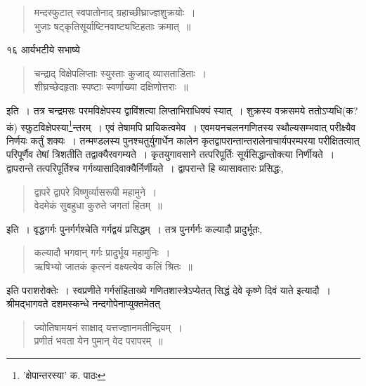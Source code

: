 \documentclass[11pt, openany]{book}
\begin{document}
{\begin{quote}
{\qt मन्दस्फुटात् स्वपातोनाद् ग्रहाच्छीघ्राज्ज्ञशुक्रयोः~।\\
भुजाः षट्कृतिसूर्याष्टिनवाष्ट्यष्टिहताः क्रमात्~॥}
\end{quote}


\newpage

\vspace{3cm} १६\hspace{4cm} आर्यभटीये सभाष्ये 

\begin{quote}
{\qt चन्द्राद् विक्षेपलिप्ताः स्युस्ताः कुजाद् व्यासताडिताः~।\\
शीघ्रच्छेदहृताः स्पष्टाः स्वर्णाख्या दक्षिणोत्तराः~॥}
\end{quote}

\noindent इति~। तत्र चन्द्रमसः परमविक्षेपस्य द्वाविंशत्या लिप्ताभिराधिक्यं स्यात्~। शुक्रस्य वक्रसमये ततोऽप्यधि(क?कं) स्फुटविक्षेपस्या\renewcommand{\thefootnote}{१}\footnote{'क्षेपान्तरस्या' क. पाठः}न्तरम्~। एवं तेषामपि प्रायिकत्वमेव~। एवमयनचलनगणितस्य स्थौल्यसम्भवात् परीक्ष्यैव निर्णयः कर्तुं शक्यः~। तन्मण्डलस्य पुनश्चतुर्युगार्धेन कालेन
कृतद्वापरान्तान्तरालेनाचार्यपरम्परया परीक्षितत्वात् परिपूर्णैव तेषां त्रिशतीति तद्वाक्यैरवगम्यते~। कृतयुगावसाने तत्परिपूर्तिः सूर्यसिद्धान्तोक्त्या निर्णीयते~। द्वापरान्ते तत्परिपूर्तिश्च गर्गव्यासादिवाक्यैर्निर्णीयते~। द्वापरान्ते हि व्यासावतारः प्रसिद्धः,

\begin{quote}
{\qt द्वापरे द्वापरे विष्णुर्व्यासरूपी महामुने~।\\
वेदमेकं सुबहुधा कुरुते जगतां हितम्~॥}
\end{quote}

\noindent इति~। वृद्धगर्गः पुनर्गर्गश्चेति गर्गद्वयं प्रसिद्धम्~। तत्र पुनर्गर्गः कल्यादौ प्रादुर्भूतः, 

\begin{quote}
{\qt कल्यादौ भगवान् गर्गः प्रादुर्भूय महामुनिः~।\\
ऋषिभ्यो जातकं कृत्स्नं वक्ष्यत्येव कलिं श्रितः~॥}
\end{quote}

\noindent इति पराशरोक्तेः~। स्वप्रणीते गर्गसंहिताख्ये गणितशास्त्रेऽप्येतत् सिद्धं {\qt देवे कृष्णे दिवं याते} इत्यादौ~। श्रीमद्भागवते दशमस्कन्धे नन्दगोपेनाप्युक्तमेतत्\textendash

\begin{quote}
{\qt ज्योतिषामयनं साक्षाद् यत्तज्ज्ञानमतीन्द्रियम्~।\\
प्रणीतं भवता येन पुमान् वेद परापरम्~॥}
\end{quote}

}
\end{document}
